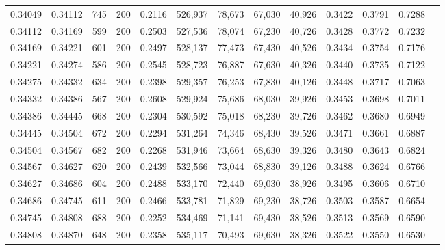 \begin{tabular}{rrrrrrrrrrrrr}
0.34049 & 0.34112 &   745 & 200 &                                     0.2116 & 526,937 &  78,673 &  67,030 &  40,926 & 0.3422 & 0.3791 & 0.7288 \\
0.34112 & 0.34169 &   599 & 200 &                                     0.2503 & 527,536 &  78,074 &  67,230 &  40,726 & 0.3428 & 0.3772 & 0.7232 \\
0.34169 & 0.34221 &   601 & 200 &                                     0.2497 & 528,137 &  77,473 &  67,430 &  40,526 & 0.3434 & 0.3754 & 0.7176 \\
0.34221 & 0.34274 &   586 & 200 &                                     0.2545 & 528,723 &  76,887 &  67,630 &  40,326 & 0.3440 & 0.3735 & 0.7122 \\
0.34275 & 0.34332 &   634 & 200 &                                     0.2398 & 529,357 &  76,253 &  67,830 &  40,126 & 0.3448 & 0.3717 & 0.7063 \\
0.34332 & 0.34386 &   567 & 200 &                                     0.2608 & 529,924 &  75,686 &  68,030 &  39,926 & 0.3453 & 0.3698 & 0.7011 \\
0.34386 & 0.34445 &   668 & 200 &                                     0.2304 & 530,592 &  75,018 &  68,230 &  39,726 & 0.3462 & 0.3680 & 0.6949 \\
0.34445 & 0.34504 &   672 & 200 &                                     0.2294 & 531,264 &  74,346 &  68,430 &  39,526 & 0.3471 & 0.3661 & 0.6887 \\
0.34504 & 0.34567 &   682 & 200 &                                     0.2268 & 531,946 &  73,664 &  68,630 &  39,326 & 0.3480 & 0.3643 & 0.6824 \\
0.34567 & 0.34627 &   620 & 200 &                                     0.2439 & 532,566 &  73,044 &  68,830 &  39,126 & 0.3488 & 0.3624 & 0.6766 \\
0.34627 & 0.34686 &   604 & 200 &                                     0.2488 & 533,170 &  72,440 &  69,030 &  38,926 & 0.3495 & 0.3606 & 0.6710 \\
0.34686 & 0.34745 &   611 & 200 &                                     0.2466 & 533,781 &  71,829 &  69,230 &  38,726 & 0.3503 & 0.3587 & 0.6654 \\
0.34745 & 0.34808 &   688 & 200 &                                     0.2252 & 534,469 &  71,141 &  69,430 &  38,526 & 0.3513 & 0.3569 & 0.6590 \\
0.34808 & 0.34870 &   648 & 200 &                                     0.2358 & 535,117 &  70,493 &  69,630 &  38,326 & 0.3522 & 0.3550 & 0.6530 \\

\end{tabular}
